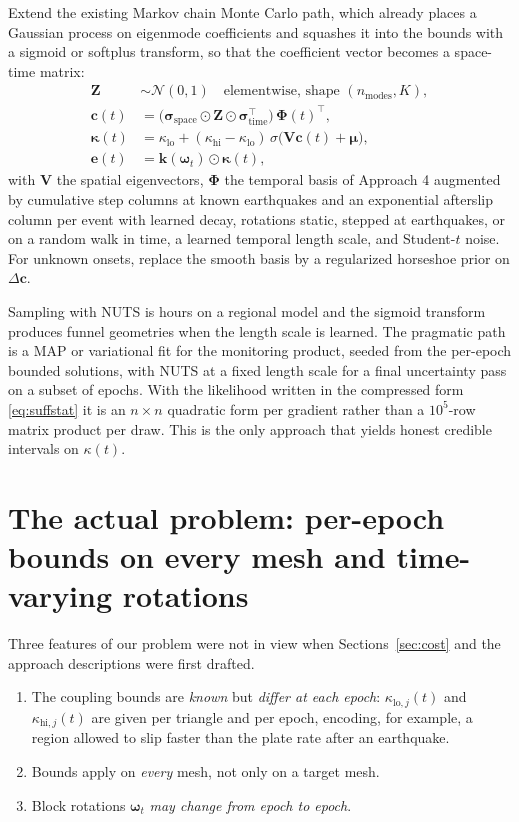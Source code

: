 \documentclass[11pt]{article}
\newcommand{\vect}[1]{\bm{#1}}
\newcommand{\mat}[1]{\mathbf{#1}}
\begin{document}
Extend the existing Markov chain Monte Carlo path, which already places a Gaussian process on eigenmode coefficients and squashes it into the bounds with a sigmoid or softplus transform, so that the coefficient vector becomes a space-time matrix:
\begin{equation}
\begin{aligned}
\mat{Z} &\sim \mathcal{N}(0, 1) \quad \text{elementwise, shape } (n_{\mathrm{modes}}, K), \\
\vect{c}(t) &= \bigl(\vect{\sigma}_{\mathrm{space}} \odot \mat{Z} \odot \vect{\sigma}_{\mathrm{time}}^{\!\top}\bigr)\, \mat{\Phi}(t)^{\!\top}, \\
\vect{\kappa}(t) &= \kappa_{\mathrm{lo}} + (\kappa_{\mathrm{hi}} - \kappa_{\mathrm{lo}})\,\sigma\!\bigl(\mat{V}\vect{c}(t) + \vect{\mu}\bigr), \\
\vect{e}(t) &= \vect{k}(\vect{\omega}_t) \odot \vect{\kappa}(t),
\end{aligned}
\end{equation}
with $\mat{V}$ the spatial eigenvectors, $\mat{\Phi}$ the temporal basis of Approach 4 augmented by cumulative step columns at known earthquakes and an exponential afterslip column per event with learned decay, rotations static, stepped at earthquakes, or on a random walk in time, a learned temporal length scale, and Student-$t$ noise. For unknown onsets, replace the smooth basis by a regularized horseshoe prior on $\Delta\vect{c}$.

Sampling with NUTS is hours on a regional model and the sigmoid transform produces funnel geometries when the length scale is learned. The pragmatic path is a MAP or variational fit for the monitoring product, seeded from the per-epoch bounded solutions, with NUTS at a fixed length scale for a final uncertainty pass on a subset of epochs. With the likelihood written in the compressed form \eqref{eq:suffstat} it is an $n \times n$ quadratic form per gradient rather than a $10^5$-row matrix product per draw. This is the only approach that yields honest credible intervals on $\kappa(t)$.

\section{The actual problem: per-epoch bounds on every mesh and time-varying rotations}
\label{sec:actual}

Three features of our problem were not in view when Sections~\ref{sec:cost} and the approach descriptions were first drafted.
\begin{enumerate}[nosep]
\item The coupling bounds are \emph{known} but \emph{differ at each epoch}: $\kappa_{\mathrm{lo},j}(t)$ and $\kappa_{\mathrm{hi},j}(t)$ are given per triangle and per epoch, encoding, for example, a region allowed to slip faster than the plate rate after an earthquake.
\item Bounds apply on \emph{every} mesh, not only on a target mesh.
\item Block rotations $\vect{\omega}_t$ \emph{may change from epoch to epoch}.
\end{enumerate}
\end{document}
